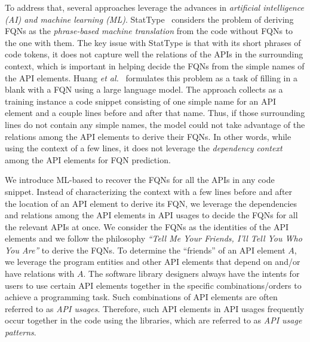 To address that, several approaches leverage the advances in {\em
  artificial intelligence (AI) and machine learning
  (ML)}. StatType~\cite{icse18} considers the problem of deriving FQNs
as the {\em phrase-based machine translation} from the code without
FQNs to the one with them. The key issue with StatType is that with
its short phrases of code tokens, it does not capture well the
relations of the APIs in the surrounding context, which is important
in helping decide the FQNs from the simple names of the API elements.
%
Huang {\em et al.}~\cite{prompt-ase22} formulates this problem as a
task of filling in a blank with a FQN using a large language model.
The approach collects as a training instance a code snippet consisting
of one simple name for an API element and a couple lines before and
after that name. Thus, if those surrounding lines do not contain any
simple names, the model could not take advantage of the relations
among the API elements to derive their FQNs. In other words, while
using the context of a few lines, it does not leverage the {\em
  dependency context} among the API elements for FQN prediction.


We introduce ML-based {\tool} to recover the FQNs for all the APIs in
any code snippet. Instead of characterizing the context with a few
lines before and after the location of an API element to derive its
FQN, we leverage the dependencies and relations among the API elements
in API usages to decide the FQNs for all the relevant APIs at once. We
consider the FQNs as the identities of the API elements and we follow
the philosophy {\em ``Tell Me Your Friends, I'll Tell You Who You
  Are''} to derive the FQNs. To determine the ``friends'' of an API
element $A$, we leverage the program entities and other API elements
that depend on and/or have relations with $A$. The software library
designers always have the intents for users to use certain API
elements together in the specific combinations/orders to achieve a
programming task. Such combinations of API elements are often referred
to as {\em API usages}. Therefore, such API elements in API usages
frequently occur together in the code using the libraries, which are
referred to as {\em API usage patterns}.

